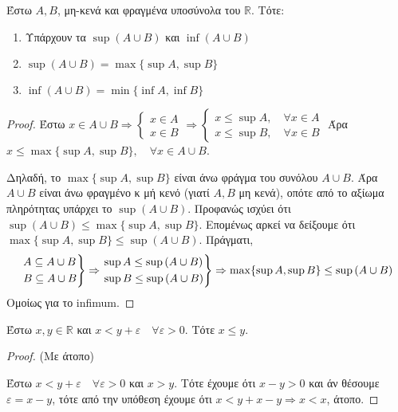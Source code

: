 \documentclass[main.tex]{subfiles}
\begin{document}
\begin{mypropbox}
  Έστω $ A, B $, μη-κενά και φραγμένα υποσύνολα του $ \mathbb{R} $. Τότε: 
  \begin{enumerate}
    \item Υπάρχουν τα $ \sup {(A \cup B)} $ και $ \inf {(A \cup B)} $
    \item $ \sup {(A \cup B)} = \max \{ \sup A, \sup B \} $
    \item $ \inf {(A \cup B)} = \min \{ \inf A, \inf B \} $
  \end{enumerate}
\end{mypropbox}
\begin{proof}
\item {}
  Έστω $ x \in A \cup B \Rightarrow 
  \begin{cases} 
    x \in A  \\
    x \in B  
  \end{cases} \Rightarrow 
  \begin{cases} 
    x \leq \sup A, \quad \forall x \in A \\
    x \leq \sup B,  \quad \forall x \in B     
  \end{cases}
  $  
  Άρα $ x \leq \max \{ \sup A, \sup B \} , \quad \forall x \in A \cup B $.

  Δηλαδή, το $ \max \{ \sup A, \sup B \} $ είναι άνω φράγμα του συνόλου 
  $ A \cup B $. Άρα $ A \cup B $ είναι άνω φραγμένο κ μή κενό 
  (γιατί $A,B$ μη κενά), οπότε από το αξίωμα πληρότητας υπάρχει το 
  $ \sup {(A \cup B)} $. 
  Προφανώς ισχύει ότι $ \sup {(A \cup B)} \leq \max \{ \sup A, \sup B \} $.
  Επομένως αρκεί να δείξουμε ότι $ \max \{ \sup A, \sup B \} \leq \sup {(A \cup B)}
  $. Πράγματι, 
  \[
    \begin{rcases} 
      A \subseteq A \cup B \\
      B \subseteq A \cup B \\
    \end{rcases} \Rightarrow 
    \begin{rcases} 
      \sup A \leq \sup {(A \cup B)} \\
      \sup B \leq \sup {(A \cup B)} \\
    \end{rcases} \Rightarrow 
    \max \{ \sup A, \sup B \} \leq \sup {(A \cup B)}
  \] 
  Ομοίως για το infimum.
\end{proof}

\begin{lem}
  \label{lem:vare2}
  Έστω $ x,y \in \mathbb{R} $ και $ x<y+ \varepsilon \quad \forall \varepsilon >0 $. 
  Τότε $ x \leq y $.
\end{lem}
\begin{proof}(Με άτοπο)
\item {}
  Έστω $ x < y+ \varepsilon \quad \forall \varepsilon >0 $ και $ x>y $. Τότε 
  έχουμε ότι $ x-y>0 $ και άν θέσουμε  $ \varepsilon = x-y $, τότε από την 
  υπόθεση έχουμε ότι $ x< y+ x-y \Rightarrow x<x $, άτοπο.
\end{proof}
\end{document}

